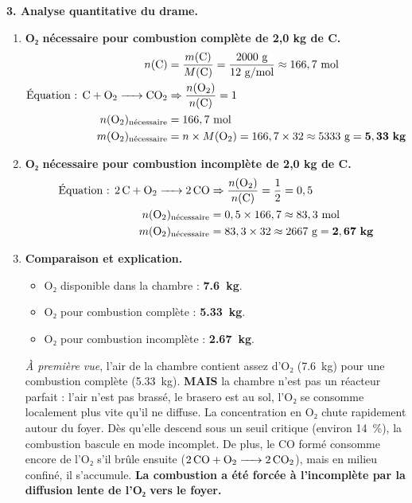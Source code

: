 \documentclass[11pt]{article}
\begin{document}
\begin{exoresolu}
\textbf{3. Analyse quantitative du drame.}
\begin{enumerate}
    \item[a)] \textbf{O₂ nécessaire pour combustion complète de 2,0 kg de C.}
    \begin{align*}
        n(\ce{C}) &= \frac{m(\ce{C})}{M(\ce{C})} = \frac{2000\ \text{g}}{12\ \text{g/mol}} \approx 166,7\ \text{mol} \\
        \text{Équation : } \ce{C + O2 -> CO2} &\Rightarrow \frac{n(\ce{O2})}{n(\ce{C})} = 1 \\
        n(\ce{O2})_{\text{nécessaire}} &= 166,7\ \text{mol} \\
        m(\ce{O2})_{\text{nécessaire}} &= n \times M(\ce{O2}) = 166,7 \times 32 \approx 5333\ \text{g} = \mathbf{5,33\ kg}
    \end{align*}
    \item[b)] \textbf{O₂ nécessaire pour combustion incomplète de 2,0 kg de C.}
    \begin{align*}
        \text{Équation : } \ce{2C + O2 -> 2CO} &\Rightarrow \frac{n(\ce{O2})}{n(\ce{C})} = \frac{1}{2} = 0,5 \\
        n(\ce{O2})_{\text{nécessaire}} &= 0,5 \times 166,7 \approx 83,3\ \text{mol} \\
        m(\ce{O2})_{\text{nécessaire}} &= 83,3 \times 32 \approx 2667\ \text{g} = \mathbf{2,67\ kg}
    \end{align*}
    \item[c)] \textbf{Comparaison et explication.}
    \begin{itemize}
        \item O₂ disponible dans la chambre : \textbf{\SI{7,6}{kg}}.
        \item O₂ pour combustion complète : \textbf{\SI{5,33}{kg}}.
        \item O₂ pour combustion incomplète : \textbf{\SI{2,67}{kg}}.
    \end{itemize}
    \emph{À première vue}, l'air de la chambre contient assez d'O₂ (\SI{7,6}{kg}) pour une combustion complète (\SI{5,33}{kg}). \textbf{MAIS} la chambre n'est pas un réacteur parfait : l'air n'est pas brassé, le brasero est au sol, l'O₂ se consomme localement plus vite qu'il ne diffuse. La concentration en O₂ chute rapidement autour du foyer. Dès qu'elle descend sous un seuil critique (environ \SI{14}{\percent}), la combustion bascule en mode incomplet. De plus, le CO formé consomme encore de l'O₂ s'il brûle ensuite ($\ce{2CO + O2 -> 2CO2}$), mais en milieu confiné, il s'accumule. \textbf{La combustion a été forcée à l'incomplète par la diffusion lente de l'O₂ vers le foyer.}

\end{enumerate}
\end{exoresolu}
\end{document}

